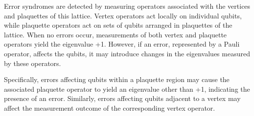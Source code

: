 \documentclass[12pt]{report}
\begin{document}
\begin{minipage}{1 \textwidth}
		Error syndromes are detected by measuring operators associated with the vertices and plaquettes of this lattice. Vertex operators act locally on individual qubits, while plaquette operators act on sets of qubits arranged in plaquettes of the lattice. When no errors occur, measurements of both vertex and plaquette operators yield the eigenvalue +1. However, if an error, represented by a Pauli operator, affects the qubits, it may introduce changes in the eigenvalues measured by these operators. 
		\newline
		
		Specifically, errors affecting qubits within a plaquette region may cause the associated plaquette operator to yield an eigenvalue other than +1, indicating the presence of an error. Similarly, errors affecting qubits adjacent to a vertex may affect the measurement outcome of the corresponding vertex operator. \newline
		
		
		
		
		
		
		
	\end{minipage}
	
\end{document}
